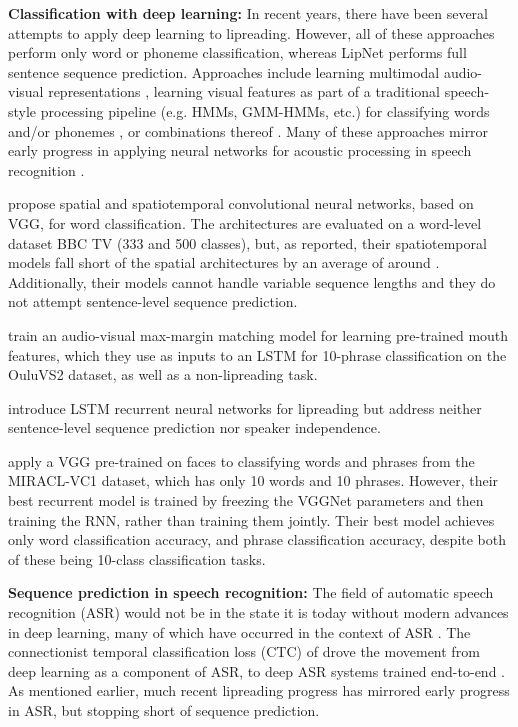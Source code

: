 \documentclass{article}
\newcommand{\minisec}[1]{\textbf{#1:}}
\begin{document}
\minisec{Classification with deep learning}
In recent years, there have been several attempts to apply deep learning to lipreading. However, all of these approaches perform only word or phoneme classification, whereas LipNet performs full sentence sequence prediction.
Approaches include learning multimodal audio-visual representations \citep{ngiam2011multimodal,sui2015listening,ninomiya2015integration,petridis2016deep},
learning visual features as part of a traditional speech-style processing pipeline (e.g. HMMs, GMM-HMMs, etc.) for classifying words and/or phonemes \citep{Almajai:2016,takashima2016audio,noda2014lipreading,koller2015deep},
or combinations thereof \citep{takashima2016audio}.
Many of these approaches mirror early progress in applying neural networks for acoustic processing in speech recognition \citep{hinton2012deep}.


\citet{chung2016lip} propose spatial and spatiotemporal convolutional neural networks, based on VGG, for word classification. The architectures are evaluated on a word-level dataset BBC TV (333 and 500 classes), but, as reported, their spatiotemporal models fall short of the spatial architectures by an average of around . Additionally, their models cannot handle variable sequence lengths and they do not attempt sentence-level sequence prediction.

\citet{chung2016out} train an audio-visual max-margin matching model for learning pre-trained mouth features, which they use as inputs to an LSTM for 10-phrase classification on the OuluVS2 dataset, as well as a non-lipreading task.

\citet{wand2016lipreading} introduce LSTM recurrent neural networks for lipreading but address neither sentence-level sequence prediction nor speaker independence.

\citet{garglip} apply a VGG pre-trained on faces to classifying words and phrases from the MIRACL-VC1 dataset, which has only 10 words and 10 phrases.
However, their best recurrent model is trained by freezing the VGGNet parameters and then training the RNN, rather than training them jointly. Their best model achieves only  word classification accuracy, and  phrase classification accuracy, despite both of these being 10-class classification tasks.

\minisec{Sequence prediction in speech recognition}
The field of automatic speech recognition (ASR) would not be in the state it is today without modern advances in deep learning, many of which have occurred in the context of ASR \citep{graves2006connectionist,dahl2012context,hinton2012deep}.
The connectionist temporal classification loss (CTC) of \citet{graves2006connectionist}
drove the movement from deep learning as a component of ASR, to deep ASR systems trained end-to-end \citep{graves2014towards,maas2015lexicon,amodei2015deep}.
As mentioned earlier, much recent lipreading progress has mirrored early progress in ASR, but stopping short of sequence prediction.
\end{document}
